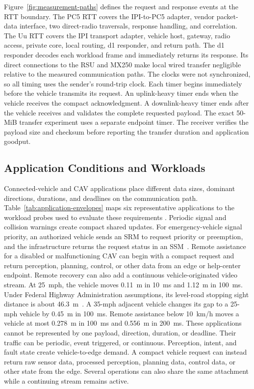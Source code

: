 Figure~\ref{fig:measurement-paths} defines the request and response events at
the RTT boundary. The PC5 RTT covers the IPI-to-PC5 adapter, vendor packet-data
interface, two direct-radio traversals, response handling, and correlation.
The Uu RTT covers the IPI transport adapter, vehicle host, gateway, radio
access, private core, local routing, d1 responder, and return path. The d1
responder decodes each workload frame and immediately returns its response.
Its direct connections to the RSU and MX250 make local wired transfer
negligible relative to the measured communication paths. The clocks were not
synchronized, so all timing uses the sender's round-trip clock. Each timer
begins immediately before the vehicle transmits its request. An uplink-heavy
timer ends when the vehicle receives the compact acknowledgment. A
downlink-heavy timer ends after the vehicle receives and validates the complete
requested payload.
The exact 50-MiB transfer experiment uses a separate endpoint timer. The
receiver verifies the payload size and checksum before reporting the
transfer duration and application goodput.

\subsection{Application Conditions and Workloads}

Connected-vehicle and CAV applications place different data sizes, dominant
directions, durations, and deadlines on the communication path.
Table~\ref{tab:application-envelopes} maps six representative applications to
the workload probes used to evaluate these requirements
\cite{nhtsa2005vsc,etsi122186r19,fivegaa2021usecases,he2024transformative}.
Periodic signal and collision warnings create compact shared updates. For
emergency-vehicle signal priority, an authorized vehicle sends an SRM to
request priority or preemption, and the infrastructure returns the request
status in an SSM~\cite{saej2735_2024}. Remote assistance for a disabled or
malfunctioning CAV can begin with a compact request and return perception,
planning, control, or other data from an edge or help-center endpoint. Remote
recovery can also add a continuous vehicle-originated video stream. At
25~mph, the vehicle moves 0.11~m in 10~ms and 1.12~m in 100~ms. Under Federal
Highway Administration assumptions, its level-road stopping sight distance is
about 46.3~m~\cite{fhwa2009speed}. A 35-mph adjacent vehicle changes its gap to
a 25-mph vehicle by 0.45~m in 100~ms. Remote assistance below 10~km/h moves a
vehicle at most 0.278~m in 100~ms and 0.556~m in 200~ms. These applications
cannot be represented by one payload, direction, duration, or deadline.
Their traffic can be periodic, event triggered, or continuous. Perception,
intent, and fault state create vehicle-to-edge demand. A compact vehicle
request can instead return raw sensor data, processed perception, planning
data, control data, or other state from the edge. Several operations can also
share the same attachment while a continuing stream remains active.

